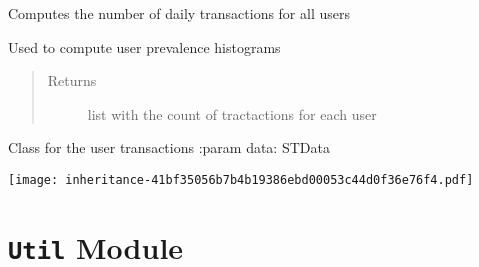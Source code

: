 \documentclass[letterpaper,10pt,english]{sphinxmanual}
\begin{document}
\begin{fulllineitems}
\begin{fulllineitems}
\end{fulllineitems}


\begin{fulllineitems}
\label{index:SuperHub.Transactions.DailyTransactions.users_prevalence}
Computes the number of daily transactions for all users

Used to compute user prevalence histograms
\begin{quote}\begin{description}
\item[{Returns}] \leavevmode
list with the count of tractactions for each user

\end{description}\end{quote}

\end{fulllineitems}


\end{fulllineitems}


\begin{fulllineitems}
\label{index:SuperHub.Transactions.Transactions}
Class for the user transactions
:param data: STData

\end{fulllineitems}


\texttt{[image: inheritance-41bf35056b7b4b19386ebd00053c44d0f36e76f4.pdf]}


\chapter{\texttt{Util} Module}
\label{index:util-module}\label{index:module-SuperHub.Util}\label{index:module-Util}
\end{document}
